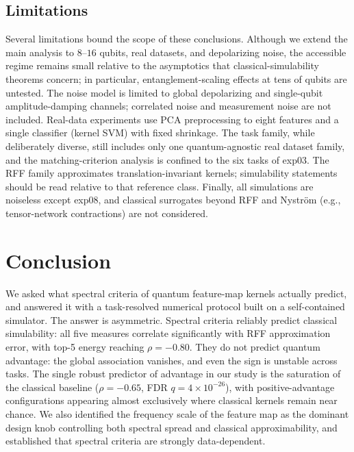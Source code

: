 \documentclass[aps,pra,preprint]{revtex4-2}
\begin{document}
\subsection{Limitations}
\label{sec:limitations}

Several limitations bound the scope of these conclusions. Although we extend the main
analysis to $8$--$16$ qubits, real datasets, and depolarizing noise, the accessible
regime remains small relative to the asymptotics that classical-simulability theorems
concern; in particular, entanglement-scaling effects at tens of qubits are untested.
The noise model is limited to global depolarizing and single-qubit amplitude-damping
channels; correlated noise and measurement noise are not included. Real-data
experiments use PCA preprocessing to eight features and a single classifier (kernel
SVM) with fixed shrinkage. The task family, while deliberately diverse, still includes
only one quantum-agnostic real dataset family, and the matching-criterion analysis is
confined to the six tasks of exp03. The RFF family approximates translation-invariant
kernels; simulability statements should be read relative to that reference class.
Finally, all simulations are noiseless except exp08, and classical surrogates beyond
RFF and Nystr\"om (e.g., tensor-network contractions) are not considered.

\section{Conclusion}
\label{sec:conclusion}

We asked what spectral criteria of quantum feature-map kernels actually predict, and
answered it with a task-resolved numerical protocol built on a self-contained
simulator. The answer is asymmetric. Spectral criteria reliably predict classical
simulability: all five measures correlate significantly with RFF approximation error,
with top-5 energy reaching $\rho=-0.80$. They do not predict quantum advantage: the
global association vanishes, and even the sign is unstable across tasks. The single
robust predictor of advantage in our study is the saturation of the classical baseline
($\rho=-0.65$, FDR $q=4\times10^{-26}$), with positive-advantage configurations
appearing almost exclusively where classical kernels remain near chance. We also
identified the frequency scale of the feature map as the dominant design knob
controlling both spectral spread and classical approximability, and established that
spectral criteria are strongly data-dependent.
\end{document}
